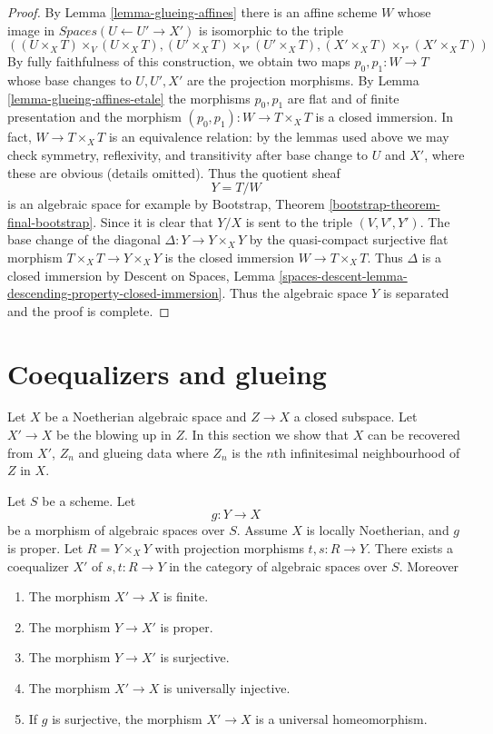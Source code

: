 \begin{proof}
\medskip\noindent
By Lemma \ref{lemma-glueing-affines} there is an affine scheme $W$ whose
image in $\textit{Spaces}(U \leftarrow U' \to X')$ is isomorphic to
the triple
$$
((U \times_X T) \times_V (U \times_X T),
(U' \times_X T) \times_{V'} (U' \times_X T),
(X' \times_X T) \times_{Y'} (X' \times_X T))
$$
By fully faithfulness of this construction, we obtain
two maps $p_0, p_1 : W \to T$ whose base changes
to $U, U', X'$ are the projection morphisms.
By Lemma \ref{lemma-glueing-affines-etale}
the morphisms $p_0, p_1$ are flat and of finite presentation and
the morphism $(p_0, p_1) : W \to T \times_X T$ is a closed immersion.
In fact, $W \to T \times_X T$ is an equivalence relation: by the lemmas
used above we may check symmetry, reflexivity, and transitivity
after base change to $U$ and $X'$, where these are obvious (details omitted).
Thus the quotient sheaf
$$
Y = T/W
$$
is an algebraic space for example by
Bootstrap, Theorem \ref{bootstrap-theorem-final-bootstrap}.
Since it is clear that $Y/X$ is sent to the triple $(V, V', Y')$.
The base change of the diagonal $\Delta : Y \to Y \times_X Y$
by the quasi-compact surjective flat morphism $T \times_X T \to Y \times_X Y$
is the closed immersion $W \to T \times_X T$. Thus $\Delta$
is a closed immersion by Descent on Spaces, Lemma
\ref{spaces-descent-lemma-descending-property-closed-immersion}.
Thus the algebraic space $Y$ is separated and the proof is complete.
\end{proof}








\section{Coequalizers and glueing}
\label{section-coequalizer-glue}

\noindent
Let $X$ be a Noetherian algebraic space and $Z \to X$ a closed subspace.
Let $X' \to X$ be the blowing up in $Z$. In this section we show that
$X$ can be recovered from $X'$, $Z_n$ and glueing data where $Z_n$
is the $n$th infinitesimal neighbourhood of $Z$ in $X$.

\begin{lemma}
\label{lemma-coequalizer}
Let $S$ be a scheme. Let
$$
g : Y \longrightarrow X
$$
be a morphism of algebraic spaces over $S$. Assume $X$ is locally Noetherian,
and $g$ is proper. Let $R = Y \times_X Y$ with projection morphisms
$t, s : R \to Y$. There exists a coequalizer $X'$ of $s, t : R \to Y$
in the category of algebraic spaces over $S$. Moreover
\begin{enumerate}
\item The morphism $X' \to X$ is finite.
\item The morphism $Y \to X'$ is proper.
\item The morphism $Y \to X'$ is surjective.
\item The morphism $X' \to X$ is universally injective.
\item If $g$ is surjective, the morphism $X' \to X$
is a universal homeomorphism.
\end{enumerate}
\end{lemma}

